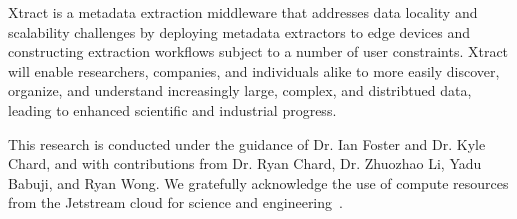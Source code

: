 \documentclass[sigconf, 9pt]{acmart}
\newcommand{\name}{Xtract}
\begin{document}
\name{} is a metadata extraction middleware that addresses data locality and 
scalability challenges by deploying metadata extractors to edge
devices and constructing extraction workflows subject to a number of user constraints. 
\name{} will enable researchers, companies, and individuals alike to more easily 
discover, organize, and understand increasingly large, complex, and distribtued 
data, leading to enhanced scientific and industrial progress. 


\begin{acks}

This research is conducted under the guidance of Dr. Ian Foster and Dr. Kyle Chard, and with contributions
from Dr. Ryan Chard, Dr. Zhuozhao Li, Yadu Babuji, and Ryan Wong. We gratefully acknowledge the use of compute 
resources from the Jetstream cloud for science and engineering~\cite{jetstream}.


\end{acks}


\end{document}
